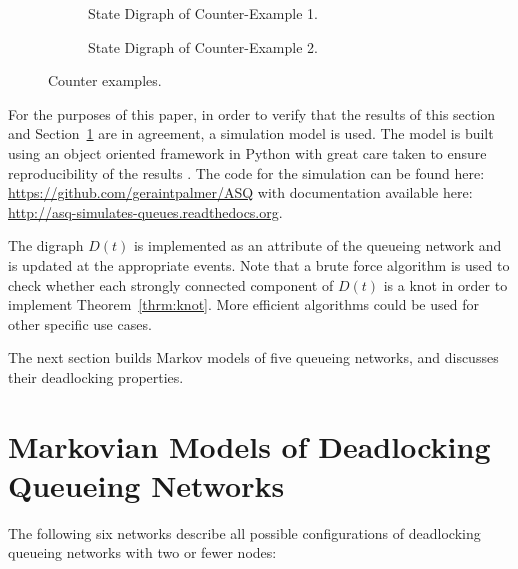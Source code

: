 \documentclass{article}
\numberwithin{equation}{section}
\begin{document}
\begin{figure}
\begin{subfigure}{0.5\textwidth}
\begin{center}

\end{center}
\caption{State Digraph of Counter-Example 1.}
\label{fig:counter_example_1}
\end{subfigure}
\begin{subfigure}{0.5\textwidth}
\begin{center}

\end{center}
\caption{State Digraph of Counter-Example 2.}
\label{fig:counter_example_2}
\end{subfigure}
\caption{Counter examples.}
\label{fig:counter_examples}
\end{figure}

For the purposes of this paper, in order to verify that the results of this
section and Section~\ref{sec:markovmodels} are in agreement, a simulation model
is used. The model is built using an object oriented framework in Python
\cite{python13} with great care taken to ensure reproducibility of the results
\cite{hongetal15}. The code for the simulation can
be found here: \url{https://github.com/geraintpalmer/ASQ} with documentation
available here: \url{http://asq-simulates-queues.readthedocs.org}.

The digraph \(D(t)\) is implemented as an attribute of the queueing network and
is updated at the appropriate events. Note that a brute force algorithm is used
to check whether each strongly connected component of $D(t)$ is a knot in order
to implement Theorem~\ref{thrm:knot}. More efficient algorithms could be used for
other specific use cases.

The next section builds Markov models of five queueing networks, and discusses their deadlocking properties.


\section{Markovian Models of Deadlocking Queueing Networks}\label{sec:markovmodels}

The following six networks describe all possible configurations of deadlocking queueing networks with two or fewer nodes:
\end{document}
